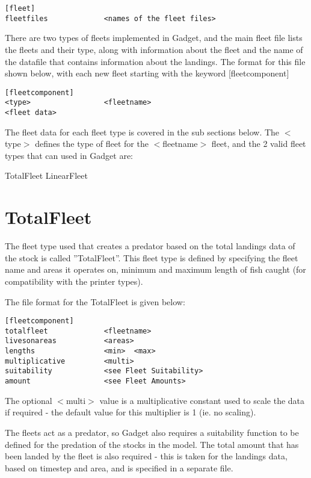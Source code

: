 \documentclass [a4paper, 10pt]{book}
\begin{document}
{\small\begin{verbatim}
[fleet]
fleetfiles             <names of the fleet files>
\end{verbatim}}

There are two types of fleets implemented in Gadget, and the main fleet file lists the fleets and their type, along with information about the fleet and the name of the datafile that contains information about the landings.  The format for this file shown below, with each new fleet starting with the keyword [fleetcomponent]

{\small\begin{verbatim}
[fleetcomponent]
<type>                 <fleetname>
<fleet data>
\end{verbatim}}

The fleet data for each fleet type is covered in the sub sections below.  The $<$type$>$ defines the type of fleet for the $<$fleetname$>$ fleet, and the 2 valid fleet types that can used in Gadget are:

\bigskip
TotalFleet\newline
LinearFleet

\newpage %
\section{TotalFleet}\label{sec:totalfleet}
The fleet type used that creates a predator based on the total landings data of the stock is called ''TotalFleet''.  This fleet type is defined by specifying the fleet name and areas it operates on, minimum and maximum length of fish caught (for compatibility with the printer types).

\bigskip
The file format for the TotalFleet is given below:

{\small\begin{verbatim}
[fleetcomponent]
totalfleet             <fleetname>
livesonareas           <areas>
lengths                <min>  <max>
multiplicative         <multi>
suitability            <see Fleet Suitability>
amount                 <see Fleet Amounts>
\end{verbatim}}

The optional $<$multi$>$ value is a multiplicative constant used to scale the data if required - the default value for this multiplier is 1 (ie. no scaling).

\bigskip
The fleets act as a predator, so Gadget also requires a suitability function to be defined for the predation of the stocks in the model.  The total amount that has been landed by the fleet is also required - this is taken for the landings data, based on timestep and area, and is specified in a separate file.
\end{document}
